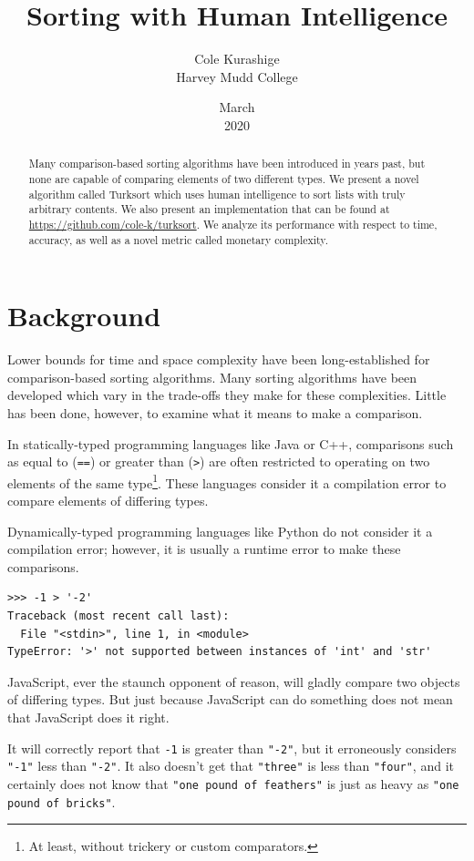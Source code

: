 \documentclass{article}
\title{Sorting with Human Intelligence}
\author{Cole Kurashige \\ Harvey Mudd College}
\date{March \\ 2020}
\begin{document}
\maketitle 

\begin{abstract}
  Many comparison-based sorting algorithms have been introduced in years past,
  but none are capable of comparing elements of two different types. We present
  a novel algorithm called Turksort which uses human intelligence to sort lists
  with truly arbitrary contents. We also present an implementation that can be
  found at \url{https://github.com/cole-k/turksort}. We analyze its performance
  with respect to time, accuracy, as well as a novel metric called monetary
  complexity.
\end{abstract}

\section{Background}
Lower bounds for time and space complexity have been long-established for
comparison-based sorting algorithms. Many sorting algorithms have been developed
which vary in the trade-offs they make for these complexities. Little has been
done, however, to examine what it means to make a comparison.

In statically-typed programming languages like Java or C++, comparisons such as
equal to (\texttt{==}) or greater than (\texttt{>}) are often restricted to
operating on two elements of the same type\footnote{At least, without trickery
  or custom comparators.}. These languages consider it a compilation error
to compare elements of differing types.

Dynamically-typed programming languages like Python do not consider it a
compilation error; however, it is usually a runtime error to make these
comparisons.

\begin{lstlisting}[caption = Comparisons in Python 3.7.6]
>>> -1 > '-2'
Traceback (most recent call last):
  File "<stdin>", line 1, in <module>
TypeError: '>' not supported between instances of 'int' and 'str'
\end{lstlisting}

JavaScript, ever the staunch opponent of reason, will gladly compare two objects
of differing types. But just because JavaScript can do something does not mean
that JavaScript does it right.

It will correctly report that \texttt{-1} is greater than \texttt{"-2"}, but it
erroneously considers \texttt{"-1"} less than \texttt{"-2"}. It also doesn't get
that \texttt{"three"} is less than \texttt{"four"}, and it certainly does not
know that \texttt{"one pound of feathers"} is just as heavy as \texttt{"one
  pound of bricks"}.
\end{document}
